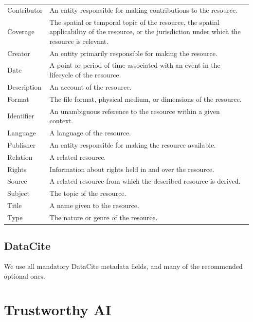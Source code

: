 \documentclass[
  a4paper,
  openany, a4paper, oneside]{book}
\begin{document}
\begin{longtable}[]{@{}
  >{\raggedright\arraybackslash}p{}
  >{\centering\arraybackslash}p{}@{}}
\toprule
& \\
\midrule
\endhead
Contributor & An entity responsible for making contributions to the resource. \\
Coverage & The spatial or temporal topic of the resource, the spatial applicability of the resource, or the jurisdiction under which the resource is relevant. \\
Creator & An entity primarily responsible for making the resource. \\
Date & A point or period of time associated with an event in the lifecycle of the resource. \\
Description & An account of the resource. \\
Format & The file format, physical medium, or dimensions of the resource. \\
Identifier & An unambiguous reference to the resource within a given context. \\
Language & A language of the resource. \\
Publisher & An entity responsible for making the resource available. \\
Relation & A related resource. \\
Rights & Information about rights held in and over the resource. \\
Source & A related resource from which the described resource is derived. \\
Subject & The topic of the resource. \\
Title & A name given to the resource. \\
Type & The nature or genre of the resource. \\
\bottomrule
\end{longtable}

\hypertarget{DataCite}{%
\section{DataCite}\label{DataCite}}

We use all mandatory DataCite metadata fields, and many of the recommended optional ones.

\hypertarget{trustworhty-ai}{%
\chapter{Trustworthy AI}\label{trustworhty-ai}}
\end{document}
